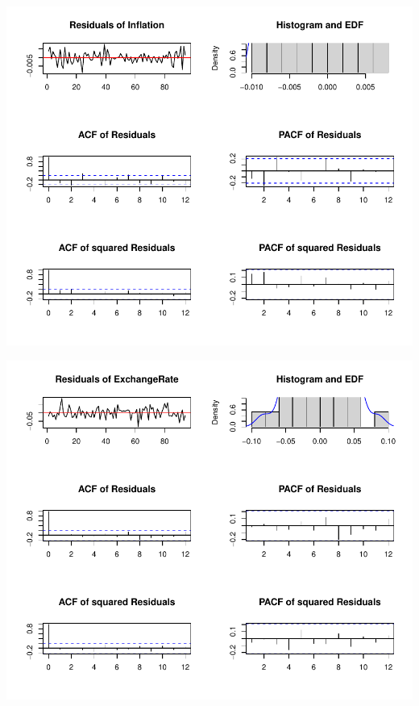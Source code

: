 \documentclass[11pt,preprint, authoryear]{elsarticle}
\let\origfigure\figure
\let\endorigfigure\endfigure
\renewenvironment{figure}[1][2] {
    \expandafter\origfigure\expandafter[H]
} {
    \endorigfigure
}
\numberwithin{equation}{section}
\numberwithin{figure}{section}
\numberwithin{table}{section}
\begin{document}
\begin{figure}
\centering
\includegraphics{Time_Series_Proj_Data_files/figure-latex/unnamed-chunk-8-1.pdf}
\caption{Diagnostics plot of VAR(2) for Inflation\label{figA4}}
\end{figure}

\begin{figure}
\centering
\includegraphics{Time_Series_Proj_Data_files/figure-latex/unnamed-chunk-9-1.pdf}
\caption{Diagnostics plot of VAR(2) for Exchange Rate\label{figA5}}
\end{figure}
\end{document}
